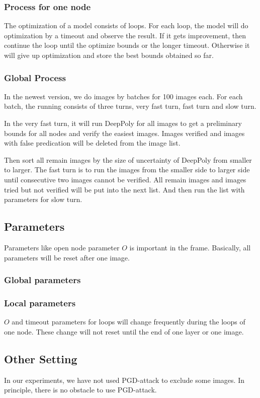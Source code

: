 \subsubsection*{Process for one node}

The optimization of a model consists of loops. For each loop, the model will do optimization by a timeout and observe the result. If it gets improvement, then continue the loop until the optimize bounds or the longer timeout. Otherwise it will give up optimization and store the best bounds obtained so far.  



\subsubsection*{Global Process}

In the newest version, we do images by batches for 100 images each. For each batch, the running consists of three turns, very fast turn, fast turn and slow turn.

In the very fast turn, it will run DeepPoly for all images to get a preliminary bounds for all nodes and verify the easiest images. Images verified and images with false predication will be deleted from the image list.

Then sort all remain images by the size of uncertainty of DeepPoly from smaller to larger. The fast turn is to run the images from the smaller side to larger side until consecutive two images cannot be verified. All remain images and images tried but not verified will be put into the next list. And then run the list with parameters for slow turn.




\subsection{Parameters}

Parameters like open node parameter $O$ is important in the frame. Basically, all parameters will be reset after one image.

\subsubsection*{Global parameters}




\subsubsection*{Local parameters}

$O$ and timeout parameters for loops will change frequently during the loops of one node. These change will not reset until the end of one layer or one image.



\subsection{Other Setting}

In our experiments, we have not used PGD-attack to exclude some images. In principle, there is no obstacle to use PGD-attack.
\fi




